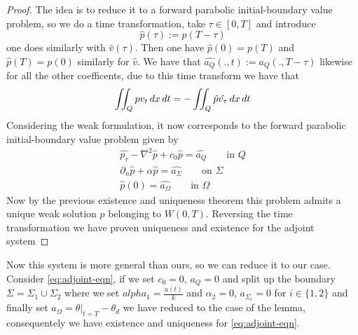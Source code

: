 \begin{proof}
The idea is to reduce it to a forward parabolic initial-boundary value problem, so we do a time transformation, take $\tau \in [0,T]$ and introduce 
\begin{equation*}
    \hat{p}(\tau) := p(T-\tau)
\end{equation*}
one does similarly with $\hat{v}(\tau)$. Then one have $\hat{p}(0) = p(T)$ and $\hat{p}(T) = p(0)$ similarly for $\hat{v}$. We have that $\hat{a_Q}(.,t):= a_Q(.,T-\tau)$ likewise for all the other coefficents, due to this time transform we have that
\begin{equation*}
    \iint_Qpv_t \mathop{dx}\mathop{dt} = - \iint_Q \hat{p}\hat{v_{\tau}} \mathop{dx}\mathop{dt}
\end{equation*}
Considering the weak formulation, it now corresponds to the forward parabolic initial-boundary value problem given by 
\begin{align*}
    \hat{p_{\tau}} - \nabla^2 \hat{p} + c_0 \hat{p} = \hat{a_Q} \qquad \text{in } Q \\
    \partial_n \hat{p} + \alpha \hat{p} = \hat{a_{\Sigma}} \qquad \text{on } \Sigma \\
    \hat{p}(0) = \hat{a_{\Omega}} \qquad \text{in } \Omega
\end{align*}
Now by the previous existence and uniqueness theorem this problem admits a unique weak solution $\hat{p}$ belonging to $W(0,T)$. Reversing the time transformation we have proven uniqueness and existence for the adjoint system
\end{proof}
Now this system is more general than ours, so we can reduce it to our case. Consider \eqref{eq:adjoint-eqn}, if we set $c_0 = 0$, $a_Q = 0$ and split up the boundary $\Sigma = \Sigma_1 \cup \Sigma_2$ where we set $alpha_1 = \frac{u(t)}{k}$ and $\alpha_2 = 0$, $a_{\Sigma_i}=0$ for $i\in \{1,2 \}$ and finally set $a_{\Omega} = \theta|_{t=T}-\theta_d$ we have reduced to the case of the lemma, consequentely we have existence and uniqueness for \eqref{eq:adjoint-eqn}.



